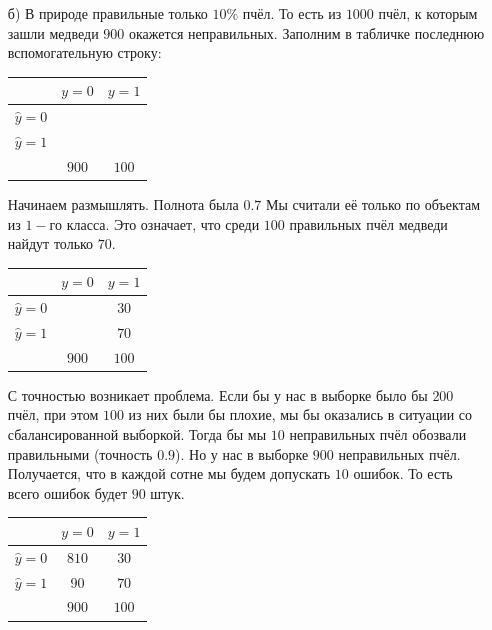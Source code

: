 \documentclass[12pt, a4paper, oneside]{article}
\theoremstyle{plain} %
\theoremstyle{definition}
\begin{document}
\begin{solution}
\begin{enumerate}
\item[б)] В природе правильные только $10\%$ пчёл. То есть из $1000$ пчёл, к которым зашли медведи $900$ окажется неправильных. Заполним в табличке последнюю вспомогательную строку: 

\begin{center}
    \begin{tabular}{|c|c|c|}
    	\hline
    	& $y=0$  &  $ y = 1$  \\  \hline 
    	$\hat y = 0$  &  &   \\      \hline 
    	$\hat y = 1$ &  &    \\ \hline 
         	& $900$ & $100$ \\ \hline 
    \end{tabular}
\end{center} 

Начинаем размышлять. Полнота была $0.7$ Мы считали её только по объектам из $1-$го класса. Это означает, что среди $100$ правильных пчёл медведи найдут только $70$.

\begin{center}
    \begin{tabular}{|c|c|c|}
    	\hline
    	& $y=0$  &  $ y = 1$  \\  \hline 
    	$\hat y = 0$  &  & $30$  \\      \hline 
    	$\hat y = 1$ &   &  $70$   \\ \hline 
         	& $900$ & $100$ \\ \hline 
    \end{tabular}
\end{center} 

С точностью возникает проблема. Если бы у нас в выборке было бы $200$ пчёл, при этом $100$ из них были бы плохие, мы бы оказались в ситуации со сбалансированной выборкой. Тогда бы мы $10$ неправильных пчёл обозвали правильными (точность $0.9$). Но у нас в выборке $900$ неправильных пчёл. Получается, что в каждой сотне мы будем допускать $10$ ошибок. То есть всего ошибок будет $90$ штук. 

\begin{center}
    \begin{tabular}{|c|c|c|}
    	\hline
    	& $y=0$  &  $ y = 1$  \\  \hline 
    	$\hat y = 0$  & $810$  & $30$  \\      \hline 
    	$\hat y = 1$ & $90$ &  $70$   \\ \hline 
         	& $900$ & $100$ \\ \hline 
    \end{tabular}
\end{center} 


\end{enumerate}
\end{solution}
\end{document}
